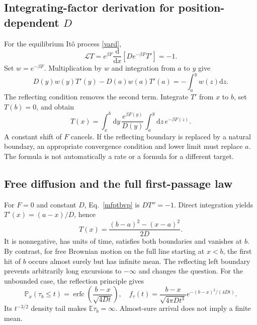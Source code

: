 \documentclass[11pt,a4paper]{article}
\newcommand{\dd}{\mathrm d}
\newcommand{\E}{\mathbb E}
\newcommand{\Pp}{\mathbb P}
\newcommand{\Lop}{\mathcal L}
\theoremstyle{remark}\newtheorem*{remark}{Physical interpretation}
\begin{document}
\subsection{Integrating-factor derivation for position-dependent $D$}
For the equilibrium It\^o process \eqref{vard},
\begin{equation}\Lop T=e^{\beta F}\frac{\dd}{\dd x}\left[D e^{-\beta F}T'\right]=-1.\end{equation}
Set $w=e^{-\beta F}$. Multiplication by $w$ and integration from $a$ to $y$ give
\begin{equation}D(y)w(y)T'(y)-D(a)w(a)T'(a)=-\int_a^y w(z)\dd z.\end{equation}
The reflecting condition removes the second term. Integrate $T'$ from $x$ to $b$, set $T(b)=0$, and obtain
\begin{equation}\label{mfptformula}\boxed{T(x)=\int_x^b\dd y\,\frac{e^{\beta F(y)}}{D(y)}\int_a^y\dd z\,e^{-\beta F(z)}.}\end{equation}
A constant shift of $F$ cancels. If the reflecting boundary is replaced by a natural boundary, an appropriate convergence condition and lower limit must replace $a$. The formula is not automatically a rate or a formula for a different target.

\subsection{Free diffusion and the full first-passage law}
For $F=0$ and constant $D$, Eq.~\eqref{mfptbvp} is $DT''=-1$. Direct integration yields $T'(x)=(a-x)/D$, hence
\begin{equation}\label{flat}\boxed{T(x)=\frac{(b-a)^2-(x-a)^2}{2D}.}\end{equation}
It is nonnegative, has units of time, satisfies both boundaries and vanishes at $b$. By contrast, for free Brownian motion on the full line starting at $x<b$, the first hit of $b$ occurs almost surely but has infinite mean. The reflecting left boundary prevents arbitrarily long excursions to $-\infty$ and changes the question. For the unbounded case, the reflection principle gives
\begin{equation}\Pp_x(\tau_b\leq t)=\operatorname{erfc}\!\left(\frac{b-x}{\sqrt{4Dt}}\right),\quad
f_{\tau}(t)=\frac{b-x}{\sqrt{4\pi D t^3}}e^{-(b-x)^2/(4Dt)}.\end{equation}
Its $t^{-3/2}$ density tail makes $\E\tau_b=\infty$. Almost-sure arrival does not imply a finite mean.
\end{document}
